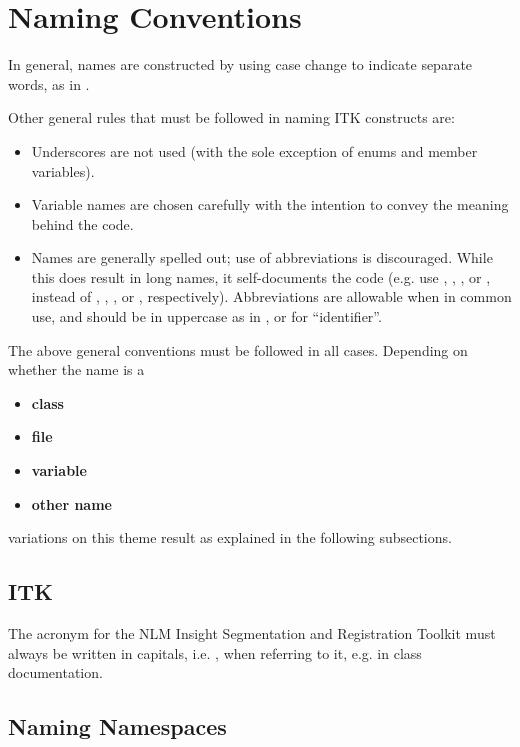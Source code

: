 \section{Naming Conventions}%
\label{sec:NamingConventions}

In general, names are constructed by using case change to indicate separate
words, as in .

Other general rules that must be followed in naming ITK constructs are:
\begin{itemize}
\item Underscores are not used (with the sole exception of enums and member
variables).
\item Variable names are chosen carefully with the intention to convey the
meaning behind the code.
\item Names are generally spelled out; use of abbreviations is discouraged.
While this does result in long names, it self-documents the code (e.g. use
, , , or , instead of
, , , or , respectively). Abbreviations
are allowable when in common use, and should be in uppercase as in ,
or  for ``identifier''.
\end{itemize}


The above general conventions must be followed in all cases. Depending on
whether the name is a
\begin{itemize}
\item \textbf{class}
\item \textbf{file}
\item \textbf{variable}
\item \textbf{other name}
\end{itemize}
variations on this theme result as explained in the following subsections.


\subsection{ITK}%
\label{subsec:ITK}

The acronym for the NLM Insight Segmentation and Registration Toolkit must
always be written in capitals, i.e. , when referring to it, e.g. in
class documentation.


\subsection{Naming Namespaces}%
\label{subsec:NamingNamespaces}

